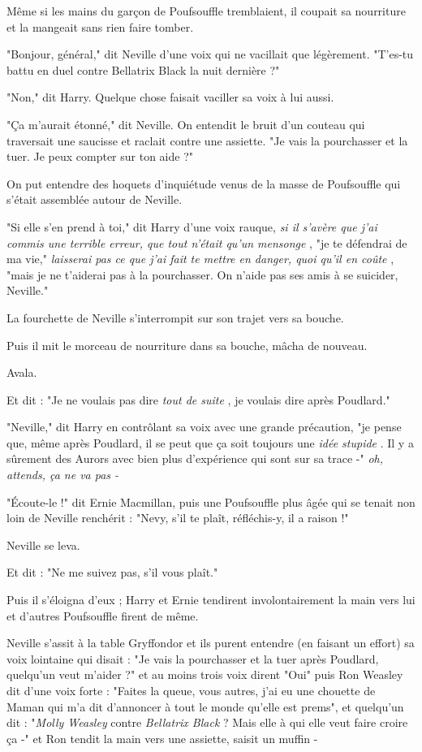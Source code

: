 Même si les mains du garçon de Poufsouffle tremblaient, il coupait sa nourriture et la mangeait sans rien faire tomber.

"Bonjour, général," dit Neville d'une voix qui ne vacillait que légèrement. "T'es-tu battu en duel contre Bellatrix Black la nuit dernière ?"

"Non," dit Harry. Quelque chose faisait vaciller sa voix à lui aussi.

"Ça m'aurait étonné," dit Neville. On entendit le bruit d'un couteau qui traversait une saucisse et raclait contre une assiette. "Je vais la pourchasser et la tuer. Je peux compter sur ton aide ?"

On put entendre des hoquets d'inquiétude venus de la masse de Poufsouffle qui s'était assemblée autour de Neville.

"Si elle s'en prend à toi," dit Harry d'une voix rauque, \emph{si il s'avère que j'ai commis une terrible erreur, que tout n'était qu'un mensonge} , "je te défendrai de ma vie," \emph{laisserai pas ce que j'ai fait te mettre en danger, quoi qu'il en coûte} , "mais je ne t'aiderai pas à la pourchasser. On n'aide pas ses amis à se suicider, Neville."

La fourchette de Neville s'interrompit sur son trajet vers sa bouche.

Puis il mit le morceau de nourriture dans sa bouche, mâcha de nouveau.

Avala.

Et dit : "Je ne voulais pas dire \emph{tout de suite} , je voulais dire après Poudlard."

"Neville," dit Harry en contrôlant sa voix avec une grande précaution, "je pense que, même après Poudlard, il se peut que ça soit toujours une \emph{idée stupide} . Il y a sûrement des Aurors avec bien plus d'expérience qui sont sur sa trace -" \emph{oh, attends, ça ne va pas -} 

"Écoute-le !" dit Ernie Macmillan, puis une Poufsouffle plus âgée qui se tenait non loin de Neville renchérit : "Nevy, s'il te plaît, réfléchis-y, il a raison !"

Neville se leva.

Et dit : "Ne me suivez pas, s'il vous plaît."

Puis il s'éloigna d'eux ; Harry et Ernie tendirent involontairement la main vers lui et d'autres Poufsouffle firent de même.

Neville s'assit à la table Gryffondor et ils purent entendre (en faisant un effort) sa voix lointaine qui disait : "Je vais la pourchasser et la tuer après Poudlard, quelqu'un veut m'aider ?" et au moins trois voix dirent "Oui" puis Ron Weasley dit d'une voix forte : "Faites la queue, vous autres, j'ai eu une chouette de Maman qui m'a dit d'annoncer à tout le monde qu'elle est prems", et quelqu'un dit : "\emph{Molly Weasley}  contre \emph{Bellatrix Black}  ? Mais elle à qui elle veut faire croire ça -" et Ron tendit la main vers une assiette, saisit un muffin -

